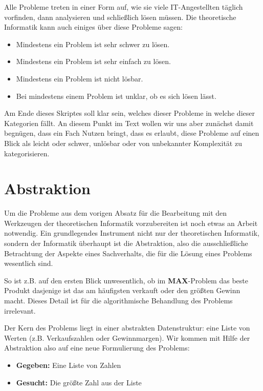 Alle Probleme treten in einer Form auf,
wie sie viele IT-Angestellten täglich vorfinden, dann analysieren und schließlich lösen müssen.
Die theoretische Informatik kann auch einiges über diese Probleme sagen:
\begin{itemize}
    \item Mindestens ein Problem ist sehr schwer zu lösen.
    \item Mindestens ein Problem ist sehr einfach zu lösen.
    \item Mindestens ein Problem ist nicht lösbar.
    \item Bei mindestens einem Problem ist unklar, ob es sich lösen lässt.
\end{itemize}

Am Ende dieses Skriptes soll klar sein, welches dieser Probleme in welche dieser Kategorien fällt.
An diesem Punkt im Text wollen wir uns aber zunächst damit begnügen,
dass ein Fach Nutzen bringt, dass es erlaubt, diese Probleme auf einen Blick als leicht oder
schwer, unlösbar oder von unbekannter Komplexität zu kategorisieren.

\section{Abstraktion}

Um die Probleme aus dem vorigen Absatz für die Bearbeitung mit den Werkzeugen der
theoretischen Informatik vorzubereiten ist noch etwas an Arbeit notwendig.
Ein grundlegendes Instrument nicht nur der theoretischen Informatik, sondern der Informatik
überhaupt ist die Abstraktion, also die ausschließliche Betrachtung der Aspekte eines Sachverhalts,
die für die Lösung eines Problems wesentlich sind.

So ist z.B. auf den ersten Blick unwesentlich,
ob im \textbf{MAX}-Problem das beste Produkt dasjenige ist
das am häufigsten verkauft oder den größten Gewinn macht.
Dieses Detail ist für die algorithmische Behandlung des Problems irrelevant.

Der Kern des Problems liegt in einer abstrakten Datenstruktur:
eine Liste von Werten (z.B. Verkaufszahlen oder Gewinnmargen).
Wir kommen mit Hilfe der Abstraktion also auf eine neue Formulierung des Problems:
\begin{itemize}
    \item \textbf{Gegeben:} Eine Liste von Zahlen
    \item \textbf{Gesucht:} Die größte Zahl aus der Liste
\end{itemize}

